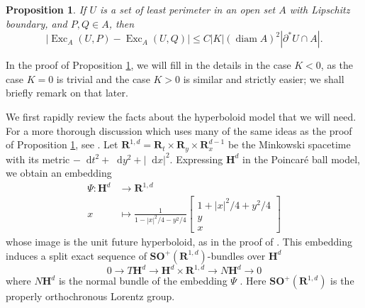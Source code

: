 \documentclass[reqno,10pt]{amsart}
\newcommand{\RR}{\mathbf{R}}
\newcommand{\Hyp}{\mathbf H}
\newcommand{\SpOrth}{\mathbf{SO}}
\DeclareMathOperator{\diam}{diam}
\DeclareMathOperator{\Exc}{Exc}
\newcommand*\dif{\mathop{}\!\mathrm{d}}
\newtheorem{proposition}[theorem]{Proposition}
\theoremstyle{definition}
\numberwithin{equation}{section}
\begin{document}
\begin{proposition}\label{translation invariance}
If $U$ is a set of least perimeter in an open set $A$ with Lipschitz boundary, and $P, Q \in A$, then
$$|\Exc_A(U, P) - \Exc_A(U, Q)| \leq C|K|(\diam A)^2 |\partial^* U \cap A|.$$
\end{proposition}

In the proof of Proposition \ref{translation invariance}, we will fill in the details in the case $K < 0$, as the case $K = 0$ is trivial and the case $K > 0$ is similar and strictly easier; we shall briefly remark on that later.

We first rapidly review the facts about the hyperboloid model that we will need.
For a more thorough discussion which uses many of the same ideas as the proof of Proposition \ref{translation invariance}, see \cite[\S3.1, \S4.1]{daskalopoulosPrep1}.
Let $\RR^{1, d} = \RR_t \times \RR_y \times \RR_x^{d - 1}$ be the Minkowski spacetime with its metric $-\dif t^2 + \dif y^2 + |\dif x|^2$.
Expressing $\Hyp^d$ in the Poincar\'e ball model, we obtain an embedding 
\begin{align*}
\Psi: \Hyp^d &\to \RR^{1, d} \\
x &\mapsto \frac{1}{1 - |x|^2/4 - y^2/4} \begin{bmatrix}1 + |x|^2/4 + y^2/4\\y \\ x\end{bmatrix}
\end{align*}
whose image is the unit future hyperboloid, as in the proof of \cite[Proposition 3.5]{lee1997riemannian}.
This embedding induces a split exact sequence of $\SpOrth^+(\RR^{1, d})$-bundles over $\Hyp^d$
\begin{equation}\label{splitting of tangent bundle}
0 \to T\Hyp^d \to \Hyp^d \times \RR^{1, d} \to N\Hyp^d \to 0
\end{equation}
where $N\Hyp^d$ is the normal bundle of the embedding $\Psi$ \cite[(3.4)]{daskalopoulosPrep1}.
Here $\SpOrth^+(\RR^{1, d})$ is the properly orthochronous Lorentz group.
\end{document}
